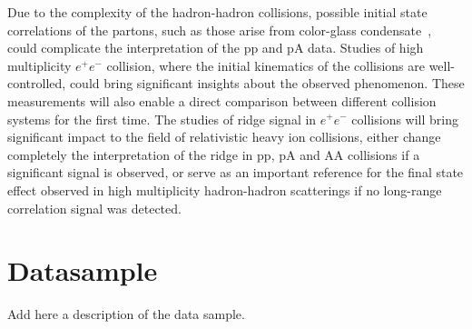 \documentclass[aps,prl,twocolumn,showpacs,superscriptaddress,groupedaddress]{revtex4}  %
\begin{document}
Due to the complexity of the hadron-hadron collisions, possible initial state correlations of the partons, such as those arise from color-glass condensate~\cite{Gelis:2010nm, Dusling:2013qoz}, could complicate the interpretation of the pp and pA data. Studies of high multiplicity $e^+e^-$ collision, where the initial kinematics of the collisions are well-controlled, could bring significant insights about the observed phenomenon. These measurements will also enable a direct comparison between different collision systems for the first time. The studies of ridge signal in $e^+e^-$ collisions will bring significant impact to the field of relativistic heavy ion collisions, either change completely the interpretation of the ridge in pp, pA and AA collisions if a significant signal is observed, or serve as an important reference for the final state effect observed in high multiplicity hadron-hadron scatterings if no long-range correlation signal was detected. 
\section{\label{sec:datasample}Datasample}
Add here a description of the data sample.
\end{document}
